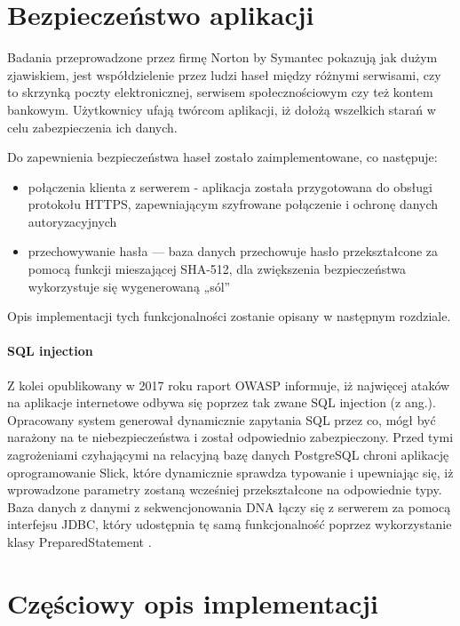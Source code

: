 \documentclass[a4paper,12pt,twoside]{article}
\begin{document}
\newpage
\section{Bezpieczeństwo aplikacji}
Badania przeprowadzone przez firmę Norton by Symantec \cite{nortonSec}
pokazują jak dużym zjawiskiem, jest współdzielenie przez ludzi haseł między różnymi serwisami, czy to
skrzynką poczty elektronicznej, serwisem społecznościowym czy też kontem bankowym.
Użytkownicy ufają twórcom aplikacji, iż dołożą wszelkich starań w celu zabezpieczenia ich
danych.

Do zapewnienia bezpieczeństwa haseł zostało zaimplementowane, co następuje:
\begin{itemize}
\item{połączenia klienta z serwerem} - aplikacja została przygotowana do obsługi protokołu HTTPS,
zapewniającym szyfrowane połączenie i ochronę danych autoryzacyjnych
\item{przechowywanie hasła — baza danych przechowuje hasło przekształcone za pomocą funkcji mieszającej SHA-512, dla zwiększenia bezpieczeństwa wykorzystuje się wygenerowaną „sól”
}
\end{itemize}
Opis implementacji tych funkcjonalności zostanie opisany w następnym rozdziale.

\paragraph{SQL injection} Z kolei opublikowany w 2017 roku raport OWASP \cite{owasp}
informuje, iż najwięcej ataków na aplikacje internetowe odbywa się poprzez tak zwane SQL injection (z ang.).
Opracowany system generował dynamicznie zapytania SQL przez co, mógł być narażony na te niebezpieczeństwa i został odpowiednio zabezpieczony.
Przed tymi zagrożeniami czyhającymi na relacyjną bazę danych PostgreSQL chroni aplikację oprogramowanie Slick, które dynamicznie sprawdza typowanie i upewniając się, iż wprowadzone parametry
zostaną wcześniej przekształcone na odpowiednie typy.
Baza danych z danymi z sekwencjonowania DNA łączy się z serwerem za pomocą interfejsu JDBC,
który udostępnia tę samą funkcjonalność poprzez wykorzystanie klasy PreparedStatement \cite{preparedStatement}.

\newpage

\section{Częściowy opis implementacji}
\end{document}
